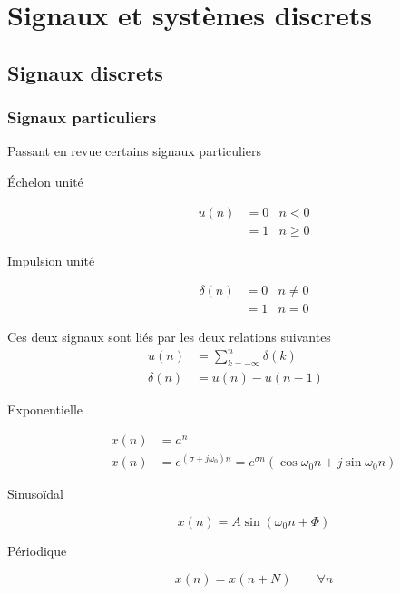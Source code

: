 \chapter{Signaux et systèmes discrets}
\section{Signaux discrets}
	\subsection{Signaux particuliers}
	Passant en revue certains signaux particuliers
	\begin{description}
	\item[Échelon unité]
	\begin{equation}
	\begin{array}{lll}
	u(n) &= 0 & n<0\\
	&=1 &n\geq 0
	\end{array}
	\end{equation}
	\item[Impulsion unité]
	\begin{equation}
	\begin{array}{lll}
	\delta(n) &= 0 & n\neq0\\
	&=1 & n=0
	\end{array}		
	\end{equation}
	\end{description}
	Ces deux signaux sont liés par les deux relations suivantes
	\begin{equation}
	\begin{array}{ll}
	u(n) &= \sum_{k=-\infty}^n \delta(k)\\
	\delta(n) &= u(n)-u(n-1)
	\end{array}
	\end{equation}
	\begin{description}
	\item[Exponentielle]
	\begin{equation}
	\begin{array}{ll}
	x(n) &= a^n\\
	x(n) &= e^{(\sigma+j\omega_0)n} = e^{\sigma n}(\cos\omega_0n+j\sin\omega_0n)
	\end{array}
	\end{equation}
	\item[Sinusoïdal]
	\begin{equation}
	x(n) = A\sin(\omega_0n+\Phi)
	\end{equation}
	\item[Périodique]
	\begin{equation}
	x(n) = x(n+N)\qquad \forall n
	\end{equation}
	\end{description}
	
